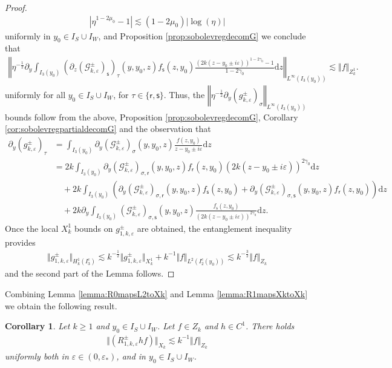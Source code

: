 \documentclass[11pt,reqno]{amsproc}
\newtheorem{corollary}[proposition]{Corollary}
\theoremstyle{definition}
\numberwithin{equation}{section}
\newcommand{\G}{{\mathcal{G}}}
\newcommand{\sr}{{\mathsf{r}}}
\newcommand{\s}{{\mathsf{s}}}
\renewcommand{\d}{\mathrm{d}}
\newcommand{\ep}{\varepsilon}
\begin{document}
\begin{proof}
\begin{align*}
\left| \eta^{1-2\mu_0} -1 \right| \lesssim (1-2\mu_0)|\log(\eta)|
\end{align*}
uniformly in $y_0\in I_S\cup I_W$, and Proposition \ref{prop:sobolevregdecomG}  we conclude that 
\begin{align*}
\left \Vert  \eta^{-\frac12} \partial_y \int_{I_3(y_0)} \left( \partial_z  \left( \G_{k,\ep}^\pm\right)_{\s} \right)_\tau (y,y_0,z)f_\s(z,y_0)  \frac{(2k(z-y_0\pm i\ep))^{1-2\gamma_0} - 1}{1-2\gamma_0}  \d z \right\Vert_{L^\infty(I_3(y_0))} \lesssim \Vert f \Vert_{Z_k^1}.
\end{align*}
uniformly for all $y_0 \in I_S\cup I_W$, for $\tau\in \lbrace \sr, \s \rbrace$. Thus, the $\left \Vert \eta^{-\frac12}\partial_y \left( g_{k,\ep}^\pm \right)_\sigma  \right\Vert_{L^\infty(I_3(y_0))}$ bounds follow from the above, Proposition \ref{prop:sobolevregdecomG}, Corollary \ref{cor:sobolevregpartialdecomG} and the observation that
\begin{align*}
\partial_y \left( g_{k,\ep}^\pm \right)_\tau &=\int_{I_3(y_0)} \partial_y\left( \G_{k,\ep}^\pm\right)_\sigma(y,y_0,z) \frac{f(z,y_0)}{z-y_0\pm i\ep} \d z \\
&= 2k\int_{I_3(y_0)} \partial_y\left( \G_{k,\ep}^\pm\right)_{\sigma,\sr}(y,y_0,z)f_\sr(z,y_0)(2k(z-y_0\pm i\ep))^{2\gamma_0} \d z \\
&\quad +2k \int_{I_3(y_0)} \left( \partial_y\left( \G_{k,\ep}^\pm\right)_{\sigma,\sr}(y,y_0,z) f_\s(z,y_0) + \partial_y\left( \G_{k,\ep}^\pm\right)_{\sigma,\s}(y,y_0,z) f_\sr(z,y_0)  \right) \d z \\
&\quad+ 2k\partial_y\int_{I_3(y_0)}  \left( \G_{k,\ep}^\pm\right)_{\sigma,\s}(y,y_0,z)\frac{f_\s(z,y_0)}{(2k(z-y_0\pm i\ep))^{2\gamma_0}} \d z.
\end{align*}
Once the local $X_k^1$ bounds on $g_{1,k,\ep}^\pm$ are obtained, the entanglement inequality provides
\begin{align*}
\Vert g_{1,k,\ep}^\pm \Vert_{H_k^1(I_3^c)} \lesssim k^{-\frac12}\Vert g_{1,k,\ep}^\pm \Vert_{X_k^1} + k^{-1}\Vert f \Vert_{L^2(I_2^c(y_0))} \lesssim k^{-\frac32}\Vert f \Vert_{Z_k}
\end{align*}
and the second part of the Lemma follows.
\end{proof}

Combining Lemma \ref{lemma:R0mapsL2toXk} and Lemma \ref{lemma:R1mapsXktoXk} we obtain the following result.

\begin{corollary}\label{cor:R1mapsCXktoXk}
Let $k\geq 1$ and $y_0\in I_S\cup I_{W}$. Let $f\in Z_k$ and $h\in C^1$. There holds
\begin{align*}
\Vert (R_{1,k,\ep}^\pm h f) \Vert_{X_k} \lesssim k^{-1}\Vert f \Vert_{Z_k}
\end{align*}
uniformly both in $\ep\in (0,\ep_*)$, and in $y_0\in I_S\cup I_{W}$.
\end{corollary}
\end{document}
